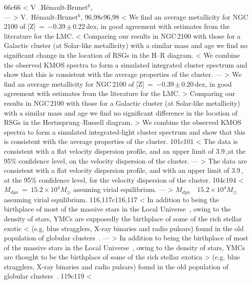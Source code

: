 66c66
< V~.H{\'e}nault-Brunet$^{6}$,\\
---
> V.~H{\'e}nault-Brunet$^{6}$,
96,98c96,98
< We find an average metallicity for NGC\,2100 of [Z]~=~$-$0.39\,$\pm$\,0.22\,dex, in good agreement with estimates from the literature for the LMC.
< Comparing our results in NGC\,2100 with those for a Galactic cluster (at Solar-like metallicity) with a similar mass and age we find no significant change in the location of RSGs in the H--R diagram.
< We combine the observed KMOS spectra to form a simulated integrated cluster spectrum and show that this is consistent with the average properties of the cluster.
---
> We find an average metallicity for NGC\,2100 of [Z]~=~$-$0.39\,$\pm$\,0.20\,dex, in good agreement with estimates from the literature for the LMC.
> Comparing our results in NGC\,2100 with those for a Galactic cluster (at Solar-like metallicity) with a similar mass and age we find no significant difference in the location of RSGs in the Hertzsprung--Russell diagram.
> We combine the observed KMOS spectra to form a simulated integrated-light cluster spectrum and show that this is consistent with the average properties of the cluster.
101c101
< The data is consistent with a flat velocity dispersion profile, and an upper limit of 3.9\,\kms,at the 95\% confidence level, on the velocity dispersion of the cluster.
---
> The data are consistent with a flat velocity dispersion profile, and with an upper limit of 3.9\,\kms, at the 95\% confidence level, for the velocity dispersion of the cluster.
104c104
< $M_{dyn}$~=~$15.2\times10^{4}M_{\odot}$ assuming virial equilibrium.
---
> $M_{dyn}$~\le~$15.2\times10^{4}M_{\odot}$ assuming virial equilibrium.
116,117c116,117
< In addition to being the birthplace of most of the massive stars in the Local Universe~\citep[$>200\,$M$_{\odot}$ stars in R136;][]{2010MNRAS.408..731C}, owing to the density of stars, YMCs are supposedly the birthplace of some of the rich stellar exotic
< (e.g. blue stragglers, X-ray binaries and radio pulsars) found in the old population of globular clusters~\citep[GCs;]{2010ARA&A..48..431P}.
---
> In addition to being the birthplace of most of the massive stars in the Local Universe~\citep[$>200\,$M$_{\odot}$ stars in R136;][]{2010MNRAS.408..731C}, owing to the density of stars, YMCs are thought to be the birthplace of some of the rich stellar exotica
> (e.g. blue stragglers, X-ray binaries and radio pulsars) found in the old population of globular clusters~\citep[GCs;][]{2010ARA&A..48..431P}.
119c119
< 
